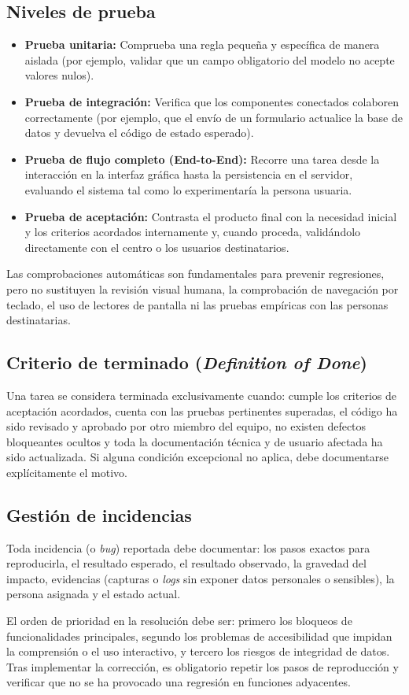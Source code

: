 \subsection{Niveles de prueba}
\begin{itemize}[leftmargin=*]
  \item \textbf{Prueba unitaria:} Comprueba una regla pequeña y específica de manera aislada (por ejemplo, validar que un campo obligatorio del modelo no acepte valores nulos).
  \item \textbf{Prueba de integración:} Verifica que los componentes conectados colaboren correctamente (por ejemplo, que el envío de un formulario actualice la base de datos y devuelva el código de estado esperado).
  \item \textbf{Prueba de flujo completo (End-to-End):} Recorre una tarea desde la interacción en la interfaz gráfica hasta la persistencia en el servidor, evaluando el sistema tal como lo experimentaría la persona usuaria.
  \item \textbf{Prueba de aceptación:} Contrasta el producto final con la necesidad inicial y los criterios acordados internamente y, cuando proceda, validándolo directamente con el centro o los usuarios destinatarios.
\end{itemize}

Las comprobaciones automáticas son fundamentales para prevenir regresiones, pero no sustituyen la revisión visual humana, la comprobación de navegación por teclado, el uso de lectores de pantalla ni las pruebas empíricas con las personas destinatarias.

\subsection{Criterio de terminado (\textit{Definition of Done})}
Una tarea se considera terminada exclusivamente cuando: cumple los criterios de aceptación acordados, cuenta con las pruebas pertinentes superadas, el código ha sido revisado y aprobado por otro miembro del equipo, no existen defectos bloqueantes ocultos y toda la documentación técnica y de usuario afectada ha sido actualizada. Si alguna condición excepcional no aplica, debe documentarse explícitamente el motivo.

\subsection{Gestión de incidencias}
Toda incidencia (o \textit{bug}) reportada debe documentar: los pasos exactos para reproducirla, el resultado esperado, el resultado observado, la gravedad del impacto, evidencias (capturas o \textit{logs} sin exponer datos personales o sensibles), la persona asignada y el estado actual. 

El orden de prioridad en la resolución debe ser: primero los bloqueos de funcionalidades principales, segundo los problemas de accesibilidad que impidan la comprensión o el uso interactivo, y tercero los riesgos de integridad de datos. Tras implementar la corrección, es obligatorio repetir los pasos de reproducción y verificar que no se ha provocado una regresión en funciones adyacentes.